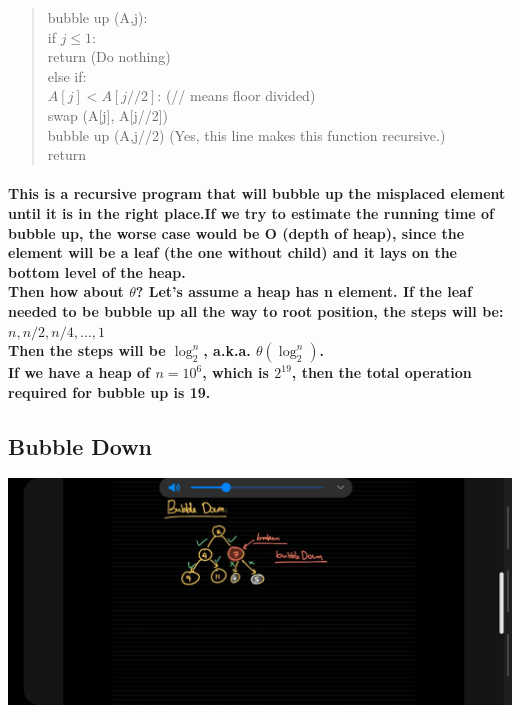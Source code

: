 \documentclass{article}
\begin{document}
\begin{quote}
    bubble up (A,j):\\
    if $j \leq 1$:\\
        return (Do nothing)\\
    else if:\\
        $A[j] < A[j//2]$: (// means floor divided)\\
        swap (A[j], A[j//2])\\
        bubble up (A,j//2) (Yes, this line makes this function recursive.)\\
    return\\
    \end{quote}

\paragraph{This is a recursive program that will bubble up the misplaced element until it is in the right place.If we try to estimate the running time of bubble up, the worse case would be O (depth of heap), since the element will be a leaf (the one without child) and it lays on the bottom level of the heap.\\
Then how about $\theta$? Let's assume a heap has n element. If the leaf needed to be bubble up all the way to root position, the steps will be:\\
$n,n/2,n/4, \ldots ,1$\\
Then the steps will be $\log_2^n$, a.k.a. $\theta(\log_2^n)$.\\
If we have a heap of $n = 10^6$, which is $2^{19}$, then the total operation required for bubble up is 19.}

\subsection{Bubble Down}


\includegraphics[width=\textwidth]{bubbledown}
\end{document}
